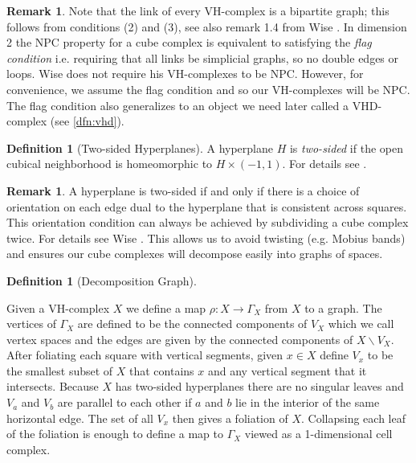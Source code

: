 \documentclass[12pt,parskip=full]{report}
\theoremstyle{plain}
\theoremstyle{definition}
\newtheorem{rmk}[thm]{Remark}
\newtheorem{dfn}[thm]{Definition}
\begin{document}
\begin{rmk}
Note that the link of every VH-complex is a bipartite graph; this follows from conditions (2) and (3), see also remark 1.4 from Wise \cite{wisethesis}. In dimension 2 the NPC property for a cube complex is equivalent to satisfying the \emph{flag condition} i.e. requiring that all links be simplicial graphs, so no double edges or loops. Wise does not require his VH-complexes to be NPC. However, for convenience, we assume the flag condition and so our VH-complexes will be NPC. The flag condition also generalizes to an object we need later called a VHD-complex (see \ref{dfn:vhd}).
\end{rmk}

\begin{dfn}
    [Two-sided Hyperplanes]
    A hyperplane \(H\) is \emph{two-sided} if the open cubical neighborhood is homeomorphic to \(H\times (-1,1)\). For details see \cite{haglundwise}.
\end{dfn}

\begin{rmk}
    A hyperplane is two-sided if and only if there is a choice of orientation on each edge dual to the hyperplane that is consistent across squares. This orientation condition can always be achieved by subdividing a cube complex twice. For details see Wise \cite{wisecsc}. This allows us to avoid twisting (e.g. Mobius bands) and ensures our cube complexes will decompose easily into graphs of spaces.
\end{rmk}

\begin{dfn}
    [Decomposition Graph]
    \label{dfn:decompositiongraph}
    
    Given a VH-complex \(X\) we define a map \(\rho: X\to \Gamma_X\) from \(X\) to a graph. The vertices of \(\Gamma_X\) are defined to be the connected components of \(V_X\) which we call vertex spaces and the edges are given by the connected components of \(X\smallsetminus V_X\). After foliating each square with vertical segments, given \(x\in X\) define \(V_x\) to be the smallest subset of \(X\) that contains \(x\) and any vertical segment that it intersects. Because \(X\) has two-sided hyperplanes there are no singular leaves and \(V_a\) and \(V_b\) are parallel to each other if \(a\) and \(b\) lie in the interior of the same horizontal edge. The set of all \(V_x\) then gives a foliation of \(X\). Collapsing each leaf of the foliation is enough to define a map to \(\Gamma_X\) viewed as a 1-dimensional cell complex. 
\end{dfn}
\end{document}
